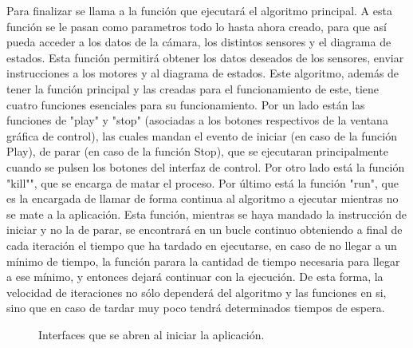 \hspace{1 cm} Para finalizar se llama a la funci\'on que ejecutar\'a el algoritmo principal. A esta funci\'on se le pasan como parametros todo lo hasta ahora creado, para que as\'i pueda acceder a los datos de la c\'amara, los distintos sensores y el diagrama de estados. Esta funci\'on permitir\'a obtener los datos deseados de los sensores, enviar instrucciones a los motores y al diagrama de estados. Este algoritmo, adem\'as de tener la funci\'on principal y las creadas para el funcionamiento de este, tiene cuatro funciones esenciales para su funcionamiento. Por un lado est\'an las funciones de "play" y "stop" (asociadas a los botones respectivos de la ventana gr\'afica de control), las cuales mandan el evento de iniciar (en caso de la funci\'on Play), de parar (en caso de la funci\'on Stop), que se ejecutaran principalmente cuando se pulsen los botones del interfaz de control. Por otro lado est\'a la funci\'on "kill"", que se encarga de matar el proceso. Por \'ultimo est\'a la funci\'on "run", que es la encargada de llamar de forma continua al algoritmo a ejecutar mientras no se mate a la aplicaci\'on. Esta funci\'on, mientras se haya mandado la instrucci\'on de iniciar y no la de parar, se encontrar\'a en un bucle continuo obteniendo a final de cada iteraci\'on el tiempo que ha tardado en ejecutarse, en caso de no llegar a un m\'inimo de tiempo, la funci\'on parara la cantidad de tiempo necesaria para llegar a ese m\'inimo, y entonces dejar\'a continuar con la ejecuci\'on. De esta forma, la velocidad de iteraciones no s\'olo depender\'a del algoritmo y las funciones en si, sino que en caso de tardar muy poco tendr\'a determinados tiempos de espera.



\begin{figure}[H]
 \centering
 \caption{Interfaces que se abren al iniciar la aplicaci\'on.}
 \label{f:PreciseLanging}
\end{figure}













